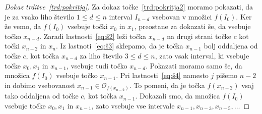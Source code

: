 \documentclass[../TG_magistrsko_delo_sections.tex]{subfiles}
\begin{document}
\begin{proof}[Dokaz trditve~\ref{trd:pokritja}]
Za dokaz točke~\ref{trd:pokritja2} moramo pokazati, da je za vsako liho število $1 \leq d \leq n$ interval $I_{n-d}$ vsebovan v množici $f(I_0)$.  
Ker že vemo, da $f(I_0)$ vsebuje točki $x_0$ in $x_1$, preostane za dokazati še, da vsebuje točko $x_{n-d}$. Zaradi lastnosti~\ref{eq:š2} leži točka $x_{n-d}$ na drugi strani točke $c$ kot točki $x_{n-2}$ in $x_n$. Iz lastnoti~\ref{eq:š3} sklepamo, da je točka $x_{n-1}$ bolj oddaljena od točke $c$, kot točka $x_{n-d}$ za liho število $3 \leq d \leq n$, zato vsak interval, ki vsebuje točke $x_0, x_1$ in $x_{n-1}$, vsebuje tudi točko $x_{n-d}$. Pokazati moramo samo še, da množica $f(I_0)$ vsebuje točko $x_{n-1}$. Pri lastnosti~\ref{eq:š4} namesto $j$ pišemo $n-2$ in dobimo vsebovanost $x_{n-1} \in \mathcal{O}_{f(x_{n-2})}$. To pomeni, da je točka $f(x_{n-2})$ vsaj tako oddaljena od točke $c$, kot točka $x_{n-1}$. Dokazali smo, da množica $f(I_0)$ vsebuje točke $x_0, x_1$ in $x_{n-1}$, zato vsebuje vse intervale $x_{n-1}, x_{n-3}, x_{n-5}, \dots$
\end{proof}
\end{document}
